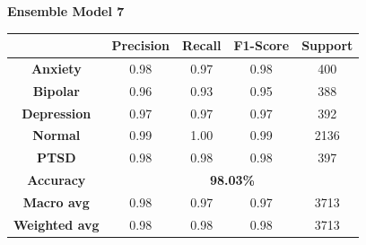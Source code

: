 \begin{center}
    \textbf{Ensemble Model 7} \\[0.5em]
    \begin{tabular}{|c|c|c|c|c|}
        \hline
        & \textbf{Precision} & \textbf{Recall} & \textbf{F1-Score} & \textbf{Support} \\ \hline
        \textbf{Anxiety}    & 0.98 & 0.97 & 0.98 & 400 \\ \hline
        \textbf{Bipolar}    & 0.96 & 0.93 & 0.95 & 388 \\ \hline
        \textbf{Depression} & 0.97 & 0.97 & 0.97 & 392 \\ \hline
        \textbf{Normal}     & 0.99 & 1.00 & 0.99 & 2136 \\ \hline
        \textbf{PTSD}       & 0.98 & 0.98 & 0.98 & 397 \\ \hline
        \textbf{Accuracy}   & \multicolumn{4}{c|}{\textbf{98.03\%}} \\ \hline
        \textbf{Macro avg}  & 0.98 & 0.97 & 0.97 & 3713 \\ \hline
        \textbf{Weighted avg} & 0.98 & 0.98 & 0.98 & 3713 \\ \hline
    \end{tabular}
\end{center}


\pagebreak

